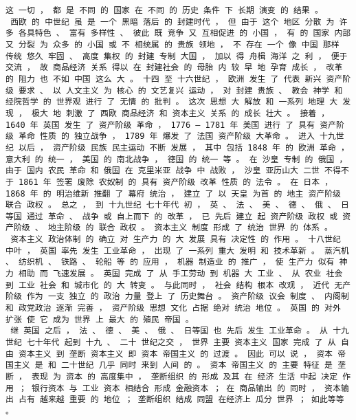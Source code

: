 \documentclass{article}
\begin{document}
\begin{Verbatim}[commandchars=\\\{\}]
 这 一切 ， 都 是 不同 的 国家 在 不同 的 历史 条件 下 长期 演变 的 结果 。 
 西欧 的 中世纪 虽 是 一个 黑暗 落后 的 封建时代 ， 但 由于 这个 地区 分散 为 许多 各具特色 、 富有 多样性 、 彼此 既 竞争 又 互相促进 的 小国 ， 有 的 国家 内部 又 分裂 为 众多 的 小国 或 不 相统属 的 贵族 领地 ， 不 存在 一个 像 中国 那样 传统 悠久 牢固 、 高度 集权 的 封建 专制 大国 ， 加以 得 舟楫 海洋 之 利 ， 便于 交流 ， 故 商品经济 关系 得以 在 封建社会 的 母胎 内 较 早 地 孕育 成长 ， 改革 的 阻力 也 不如 中国 这么 大 。 十四 至 十六世纪 ， 欧洲 发生 了 代表 新兴 资产阶级 要求 、 以 人文主义 为 核心 的 文艺复兴 运动 ， 对 封建 贵族 、 教会 神学 和 经院哲学 的 世界观 进行 了 无情 的 批判 。 这次 思想 大 解放 和 一系列 地理 大 发现 ， 极大 地 刺激 了 西欧 商品经济 和 资本主义 关系 的 成长 壮大 。 接着 ， 1640 年 英国 发生 了 资产阶级 革命 ， 1776 — 1781 年 美国 进行 了 具有 资产阶级 革命 性质 的 独立战争 ， 1789 年 爆发 了 法国 资产阶级 大革命 。 进入 十九世纪 以后 ， 资产阶级 民族 民主运动 不断 发展 ， 其中 包括 1848 年 的 欧洲 革命 ， 意大利 的 统一 ， 美国 的 南北战争 ， 德国 的 统一 等 。 在 沙皇 专制 的 俄国 ， 由于 国内 农民 革命 和 俄国 在 克里米亚 战争 中 战败 ， 沙皇 亚历山大 二世 不得不 于 1861 年 签署 废除 农奴制 的 具有 资产阶级 改革 性质 的 法令 。 在 日本 ， 1868 年 的 明治维新 推翻 了 幕府 统治 ， 建立 了 以 天皇 为首 的 地主 资产阶级 联合 政权 。 总之 ， 到 十九世纪 七十年代 初 ， 英 、 法 、 美 、 德 、 俄 、 日等国 通过 革命 、 战争 或 自上而下 的 改革 ， 已 先后 建立 起 资产阶级 政权 或 资产阶级 、 地主阶级 的 联合 政权 。 资本主义 制度 形成 了 统治 世界 的 体系 。 
 资本主义 政治体制 的 确立 对 生产力 的 大 发展 具有 决定性 的 作用 。 十八世纪 中叶 ， 英国 率先 发生 工业革命 ， 出现 了 一系列 重大 发明 和 技术革新 。 蒸汽机 、 纺织机 、 铁路 、 轮船 等 的 应用 ， 机器 制造业 的 推广 ， 使 生产力 似有 神力 相助 而 飞速发展 。 英国 完成 了 从 手工劳动 到 机器 大 工业 、 从 农业 社会 到 工业 社会 和 城市化 的 大 转变 。 与此同时 ， 社会 结构 根本 改观 ， 近代 无产阶级 作为 一支 独立 的 政治 力量 登上 了 历史舞台 。 资产阶级 议会 制度 、 内阁制 和 政党政治 逐渐 完善 ， 资产阶级 思想 文化 占据 绝对 统治 地位 。 英国 的 对外 扩张 使 它 成为 世界 上 最大 的 殖民 帝国 。 
 继 英国 之后 ， 法 、 德 、 美 、 俄 、 日等国 也 先后 发生 工业革命 。 从 十九世纪 七十年代 起到 十九 、 二十 世纪之交 ， 世界 主要 资本主义 国家 完成 了 从 自由 资本主义 到 垄断 资本主义 即 资本 帝国主义 的 过渡 。 因此 可以 说 ， 资本 帝国主义 是 和 二十世纪 几乎 同时 来到 人间 的 。 资本 帝国主义 的 主要 特征 是 垄断 ， 表现 为 资本 的 高度集中 ， 垄断组织 的 形成 及其 在 经济 生活 中起 决定 作用 ； 银行资本 与 工业 资本 相结合 形成 金融资本 ； 在 商品输出 的 同时 ， 资本输出 占有 越来越 重要 的 地位 ； 垄断组织 结成 同盟 在经济上 瓜分 世界 ； 如此等等 。 

\end{Verbatim}
\end{document}
